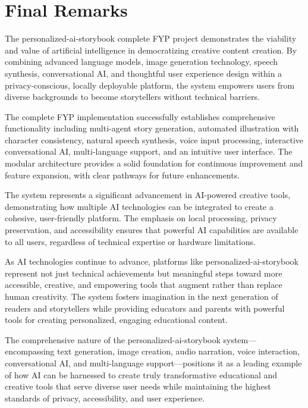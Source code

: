 \section{Final Remarks}
The personalized-ai-storybook complete FYP project demonstrates the viability and value of artificial intelligence in democratizing creative content creation. By combining advanced language models, image generation technology, speech synthesis, conversational AI, and thoughtful user experience design within a privacy-conscious, locally deployable platform, the system empowers users from diverse backgrounds to become storytellers without technical barriers.

The complete FYP implementation successfully establishes comprehensive functionality including multi-agent story generation, automated illustration with character consistency, natural speech synthesis, voice input processing, interactive conversational AI, multi-language support, and an intuitive user interface. The modular architecture provides a solid foundation for continuous improvement and feature expansion, with clear pathways for future enhancements.

The system represents a significant advancement in AI-powered creative tools, demonstrating how multiple AI technologies can be integrated to create a cohesive, user-friendly platform. The emphasis on local processing, privacy preservation, and accessibility ensures that powerful AI capabilities are available to all users, regardless of technical expertise or hardware limitations.

As AI technologies continue to advance, platforms like personalized-ai-storybook represent not just technical achievements but meaningful steps toward more accessible, creative, and empowering tools that augment rather than replace human creativity. The system fosters imagination in the next generation of readers and storytellers while providing educators and parents with powerful tools for creating personalized, engaging educational content.

The comprehensive nature of the personalized-ai-storybook system—encompassing text generation, image creation, audio narration, voice interaction, conversational AI, and multi-language support—positions it as a leading example of how AI can be harnessed to create truly transformative educational and creative tools that serve diverse user needs while maintaining the highest standards of privacy, accessibility, and user experience.

\clearpage
